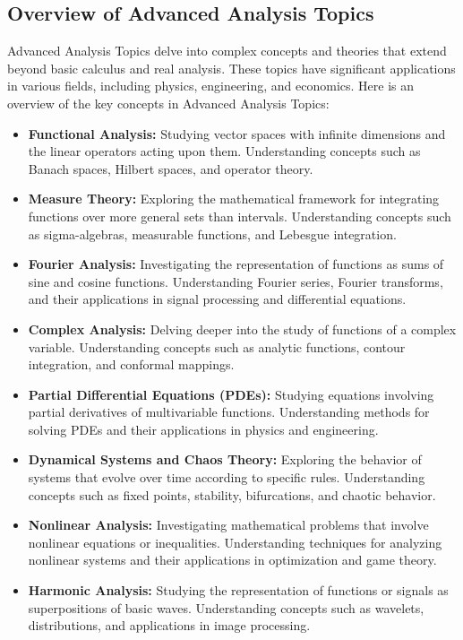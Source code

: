 \documentclass[openany]{book}
\begin{document}
\subsection{Overview of Advanced Analysis Topics}
Advanced Analysis Topics delve into complex concepts and theories that extend beyond basic calculus and real analysis. These topics have significant applications in various fields, including physics, engineering, and economics. Here is an overview of the key concepts in Advanced Analysis Topics:
\begin{itemize}
    \item \textbf{Functional Analysis:} Studying vector spaces with infinite dimensions and the linear operators acting upon them. Understanding concepts such as Banach spaces, Hilbert spaces, and operator theory.
    \item \textbf{Measure Theory:} Exploring the mathematical framework for integrating functions over more general sets than intervals. Understanding concepts such as sigma-algebras, measurable functions, and Lebesgue integration.
    \item \textbf{Fourier Analysis:} Investigating the representation of functions as sums of sine and cosine functions. Understanding Fourier series, Fourier transforms, and their applications in signal processing and differential equations.
    \item \textbf{Complex Analysis:} Delving deeper into the study of functions of a complex variable. Understanding concepts such as analytic functions, contour integration, and conformal mappings.
    \item \textbf{Partial Differential Equations (PDEs):} Studying equations involving partial derivatives of multivariable functions. Understanding methods for solving PDEs and their applications in physics and engineering.
    \item \textbf{Dynamical Systems and Chaos Theory:} Exploring the behavior of systems that evolve over time according to specific rules. Understanding concepts such as fixed points, stability, bifurcations, and chaotic behavior.
    \item \textbf{Nonlinear Analysis:} Investigating mathematical problems that involve nonlinear equations or inequalities. Understanding techniques for analyzing nonlinear systems and their applications in optimization and game theory.
    \item \textbf{Harmonic Analysis:} Studying the representation of functions or signals as superpositions of basic waves. Understanding concepts such as wavelets, distributions, and applications in image processing.

\end{itemize}
\end{document}
